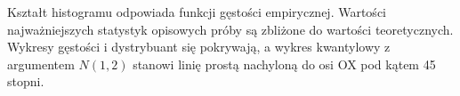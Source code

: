 \documentclass[12pt]{mwart}
\begin{document}
	\begin{figure} [H]
		\centering 
	\end{figure}
	
	\begin{figure} [H]
		\centering 
	\end{figure}
	
	\noindent Kształt histogramu odpowiada funkcji gęstości empirycznej. Wartości najważniejszych statystyk opisowych próby są zbliżone do wartości teoretycznych.
 Wykresy gęstości i dystrybuant się pokrywają, a wykres kwantylowy z argumentem $N(1,2)$ stanowi linię prostą nachyloną do osi OX pod kątem 45 stopni.
 
\end{document}
